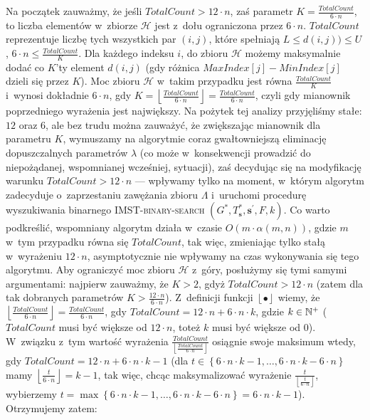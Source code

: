 Na początek zauważmy, że jeśli $TotalCount > 12 \cdot n$, zaś parametr $K = \frac{TotalCount}{6 \cdot n}$, to liczba elementów w~zbiorze $\mathcal{H}$ jest z~dołu ograniczona przez $6 \cdot n$. $TotalCount$ reprezentuje liczbę tych wszystkich par $\left( i, j \right)$, które spełniają $L \leqslant d \left( i, j \right)) \leqslant U$, $6 \cdot n \leqslant \frac{TotalCount}{K}$. Dla każdego indeksu $i$, do zbioru $\mathcal{H}$ możemy maksymalnie dodać co $K$'ty element $d \left( i, j \right)$ (gdy różnica $MaxIndex \left[ j \right] - MinIndex \left[ j \right]$ dzieli się przez $K$). Moc zbioru $\mathcal{H}$ w~takim przypadku jest równa $\frac{TotalCount}{K}$ i~wynosi dokładnie $6 \cdot n$, gdy $K = \left\lfloor \frac{TotalCount}{6 \cdot n} \right\rfloor = \frac{TotalCount}{6 \cdot n}$, czyli gdy mianownik poprzedniego wyrażenia jest największy. Na pożytek tej analizy przyjęliśmy stałe: $12$ oraz $6$, ale bez trudu można zauważyć, że zwiększając mianownik dla parametru $K$, wymuszamy na algorytmie coraz gwałtowniejszą eliminację dopuszczalnych parametrów $\lambda$ (co może w~konsekwencji prowadzić do niepożądanej, wspomnianej wcześniej, sytuacji), zaś decydując się na modyfikację warunku $TotalCount > 12 \cdot n$ --- wpływamy tylko na moment, w~którym algorytm zadecyduje o~zaprzestaniu zawężania zbioru $\Lambda$ i~uruchomi procedurę wyszukiwania binarnego \textsc{IMST-binary-search} $\left( G^{\ast}, T^{\ast}_{\textbf{s}}, \textbf{s}^{\prime}, F, k \right)$. Co warto podkreślić, wspomniany algorytm działa w~czasie $O \left( m \cdot \alpha \left( m, n \right) \right)$, gdzie $m$ w~tym przypadku równa się $TotalCount$, tak więc, zmieniając tylko stałą w~wyrażeniu $12 \cdot n$, asymptotycznie nie wpływamy na czas wykonywania się tego algorytmu. Aby ograniczyć moc zbioru $\mathcal{H}$ z~góry, posłużymy się tymi samymi argumentami: najpierw zauważmy, że $K > 2$, gdyż $TotalCount > 12 \cdot n$ (zatem dla tak dobranych parametrów $K > \frac{12 \cdot n}{6 \cdot n}$). Z~definicji funkcji $\left\lfloor \bullet \right\rfloor$ wiemy, że $\left\lfloor \frac{TotalCount}{6 \cdot n} \right\rfloor = \frac{TotalCount}{6 \cdot n}$, gdy $TotalCount = 12 \cdot n + 6 \cdot n \cdot k$, gdzie $k \in \mathbb{N}^{+}$ ($TotalCount$ musi być większe od $12 \cdot n$, toteż $k$ musi być większe od $0$). W~związku z~tym wartość wyrażenia $\frac{TotalCount}{\left\lfloor \frac{TotalCount}{6 \cdot n} \right\rfloor}$ osiągnie swoje maksimum wtedy, gdy $TotalCount = 12 \cdot n + 6 \cdot n \cdot k - 1$ (dla $t \in \left\{ 6 \cdot n \cdot k - 1, \dots, 6 \cdot n \cdot k - 6 \cdot n \right\}$ mamy $\left\lfloor \frac{t}{6 \cdot n} \right\rfloor = k - 1$, tak więc, chcąc maksymalizować wyrażenie $\frac{t}{\left\lfloor \frac{t}{6 \cdot n} \right\rfloor}$, wybierzemy $t = \max \left\{ 6 \cdot n \cdot k - 1, \dots, 6 \cdot n \cdot k - 6 \cdot n \right\} = 6 \cdot n \cdot k - 1$). Otrzymujemy zatem:

